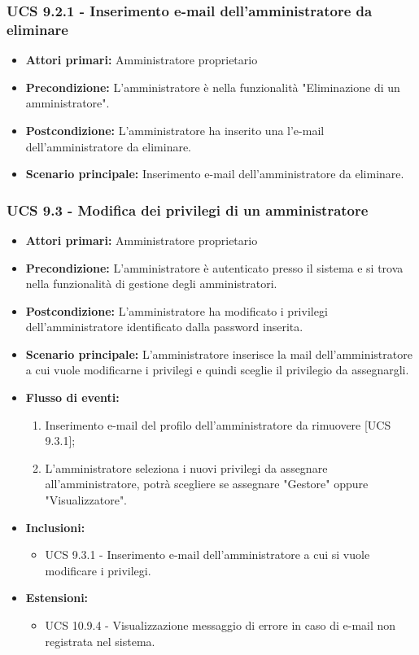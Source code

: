 \subsubsection{UCS 9.2.1 - Inserimento e-mail dell'amministratore da eliminare}%
\begin{itemize}
\item \textbf{Attori primari:} Amministratore proprietario
\item \textbf{Precondizione:} L'amministratore è nella funzionalità "Eliminazione di un amministratore".
\item \textbf{Postcondizione:} L'amministratore ha inserito una l'e-mail dell'amministratore da eliminare.
\item \textbf{Scenario principale:} Inserimento e-mail dell'amministratore da eliminare.
\end{itemize}

\subsubsection{UCS 9.3 - Modifica dei privilegi di un amministratore}%
\begin{itemize}
\item \textbf{Attori primari:} Amministratore proprietario
\item \textbf{Precondizione:} L'amministratore è autenticato presso il sistema e si trova nella funzionalità di gestione degli amministratori.
\item \textbf{Postcondizione:} L'amministratore ha modificato i privilegi dell'amministratore identificato dalla password inserita.
\item \textbf{Scenario principale:} L'amministratore inserisce la mail dell'amministratore a cui vuole modificarne i privilegi e quindi sceglie il privilegio da assegnargli.
\item \textbf{Flusso di eventi:} %
  \begin{enumerate}
        \item Inserimento e-mail del profilo dell'amministratore da rimuovere [UCS 9.3.1];
        \item L'amministratore seleziona i nuovi privilegi da assegnare all'amministratore, potrà scegliere se assegnare "Gestore" oppure "Visualizzatore".
    \end{enumerate}
\item \textbf{Inclusioni:}
\begin{itemize}
    \item UCS 9.3.1 - Inserimento e-mail dell'amministratore a cui si vuole modificare i privilegi.
\end{itemize}
\item \textbf{Estensioni:}
	\begin{itemize}
		\item UCS 10.9.4 - Visualizzazione messaggio di errore in caso di e-mail non registrata nel sistema.
	\end{itemize}
\end{itemize}

